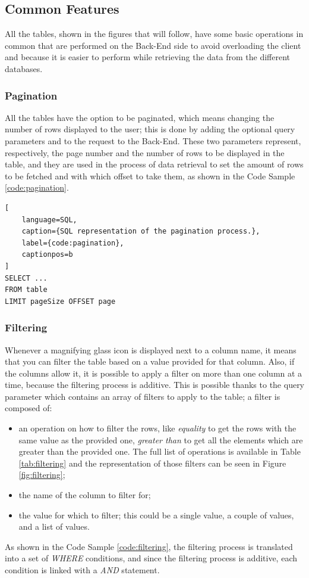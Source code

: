 \subsection*{Common Features} 
All the tables, shown in the figures that will follow, have some basic operations in common that are performed on the Back-End side to avoid overloading the client and because it is easier to perform while retrieving the data from the different databases. 

\subsubsection{Pagination}
All the tables have the option to be paginated, which means changing the number of rows displayed to the user; this is done by adding the optional query parameters  and  to the request to the Back-End. 
These two parameters represent, respectively, the page number and the number of rows to be displayed in the table, and they are used in the process of data retrieval to set the amount of rows to be fetched and with which offset to take them, as shown in the Code Sample \ref{code:pagination}. 

\begin{lstlisting}[
    language=SQL, 
    caption={SQL representation of the pagination process.}, 
    label={code:pagination},
    captionpos=b
]
SELECT ...
FROM table
LIMIT pageSize OFFSET page
\end{lstlisting}

\subsubsection{Filtering}
Whenever a magnifying glass icon is displayed next to a column name, it means that you can filter the table based on a value provided for that column. Also, if the columns allow it, it is possible to apply a filter on more than one column at a time, because the filtering process is additive. This is possible thanks to the query parameter  which contains an array of filters to apply to the table; a filter is composed of: 
\begin{itemize}
    \item an operation on how to filter the rows, like \emph{equality} to get the rows with the same value as the provided one, \emph{greater than} to get all the elements which are greater than the provided one. The full list of operations is available in Table \ref{tab:filtering} and the representation of those filters can be seen in Figure \ref{fig:filtering};
    \item the name of the column to filter for;
    \item the value for which to filter; this could be a single value, a couple of values, and a list of values.
\end{itemize}
 As shown in the Code Sample \ref{code:filtering}, the filtering process is translated into a set of \emph{WHERE} conditions, and since the filtering process is additive, each condition is linked with a \emph{AND} statement.

